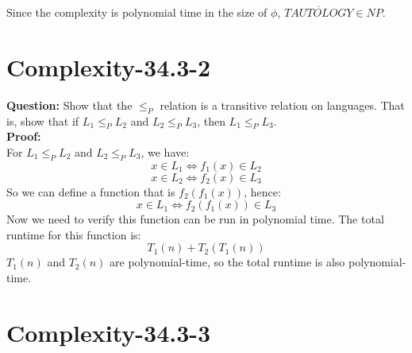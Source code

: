 \documentclass[12pt]{article}
\begin{document}
Since the complexity is polynomial time in the size of $\phi$, $\overline{TAUTOLOGY} \in NP$.

\section{Complexity-34.3-2}
\textbf{Question:} Show that the \(\leq_P\) relation is a transitive relation on languages. That is, show that if \(L_1 \leq_PL_2 \) and \(L_2\leq_P L_3\), then \(L_1\leq_P L_3\). \\
\textbf{Proof:}\\
For \(L_1 \leq_PL_2 \) and \(L_2\leq_P L_3\), we have:
\[x \in L_1 \iff f_1(x) \in L_2\]
\[x \in L_2 \iff f_2(x) \in L_3\]
So we can define a function that is \(f_2(f_1(x))\), hence:
\[x \in L_1 \iff f_2(f_1(x)) \in L_3\]
Now we need to verify this function can be run in polynomial time.
The total runtime for this function is:
\[T_1(n)+T_2(T_1(n))\]
\(T_1(n)\) and \(T_2(n)\) are polynomial-time, so the total runtime is also polynomial-time.






\section{Complexity-34.3-3}
\end{document}
